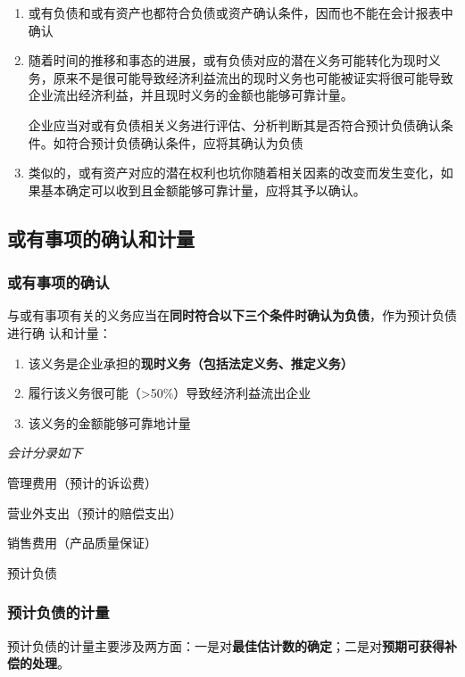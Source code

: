\documentclass[UTF8,12pt]{ctexart}
\newenvironment{Dr}{%
	\begin{list}{}%
		{
			\setlength{\leftmargin}{2em}
			\setlength{\labelwidth}{2em}
			\setlength{\labelsep}{0pt}
			\setlength{\itemindent}{0pt}
			\setlength{\listparindent}{0pt}
			\setlength{\parsep}{0pt}
			\setlength{\topsep}{0pt}
		}
		\item[\textbf{借：}]
	}{%
	\end{list}
}
\newenvironment{Cr}{%
	\begin{list}{}%
		{
			\setlength{\leftmargin}{3em}
			\setlength{\labelwidth}{2em}
			\setlength{\labelsep}{0pt}
			\setlength{\itemindent}{0pt}
			\setlength{\listparindent}{0pt}
			\setlength{\parsep}{0pt}
			\setlength{\topsep}{0pt}
		}
		\item[\textbf{贷：}]
	}{%
	\end{list}
}
\numberwithin{equation}{section} %
\numberwithin{figure}{section}
\numberwithin{table}{section}
\begin{document}
	\begin{enumerate}
		\item 或有负债和或有资产也都符合负债或资产确认条件，因而也不能在会计报表中确认
		
		\item 随着时间的推移和事态的进展，或有负债对应的潜在义务可能转化为现时义务，原来不是很可能导致经济利益流出的现时义务也可能被证实将很可能导致企业流出经济利益，并且现时义务的金额也能够可靠计量。
		
		企业应当对或有负债相关义务进行评估、分析判断其是否符合预计负债确认条件。如符合预计负债确认条件，应将其确认为负债
		
		\item 类似的，或有资产对应的潜在权利也坑你随着相关因素的改变而发生变化，如果基本确定可以收到且金额能够可靠计量，应将其予以确认。
	\end{enumerate}
	
	\subsection{或有事项的确认和计量}
	\subsubsection{或有事项的确认}
	与或有事项有关的义务应当在\textbf{同时符合以下三个条件时确认为负债}，作为预计负债进行确  认和计量：
	\begin{enumerate}
		\item 该义务是企业承担的\textbf{现时义务（包括法定义务、推定义务）}
		
		\item 履行该义务很可能（>50\%）导致经济利益流出企业
		
		\item 该义务的金额能够可靠地计量
	\end{enumerate}
	
	\textit{会计分录如下}
	
	\begin{Dr}
		管理费用（预计的诉讼费）
		
		营业外支出（预计的赔偿支出） 
		
		销售费用（产品质量保证）
	\end{Dr}
	\begin{Cr}
		预计负债
	\end{Cr}
	
	\subsubsection{预计负债的计量}
	预计负债的计量主要涉及两方面：一是对\textbf{最佳估计数的确定}；二是对\textbf{预期可获得补偿的处理}。
	
\end{document}
